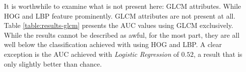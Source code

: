 \documentclass[letterpaper]{article}
\begin{document}
{It is worthwhile to examine what is not present here: GLCM attributes. While HOG and LBP feature prominently. GLCM attributes are not present at all. Table \ref{table:results-glcm} presents the AUC values using GLCM exclusively. While the results cannot be described as awful, for the most part, they are all well below the classification achieved with using HOG and LBP. A clear exception is the AUC achieved with \textit{Logistic Regression} of $0.52$, a result that is only slightly better than chance.

\begin{tiny}
\renewcommand{\arraystretch}{1.2}

\end{tiny}

%
%
}
\end{document}
